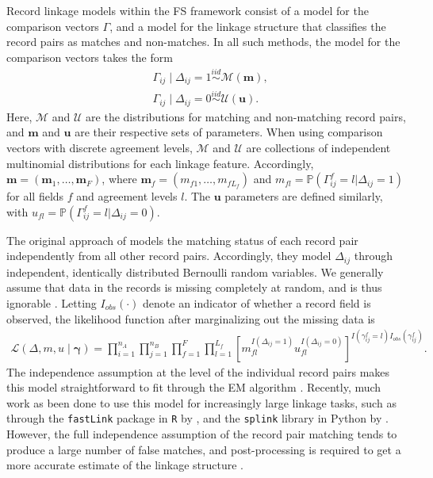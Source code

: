 \documentclass[12pt,letterpaper]{article}
\newcommand{\1}[1]{\mathbb{I}\!\left[#1\right]} %
\begin{document}
Record linkage models within the FS framework consist of a model for the comparison vectors $\Gamma$, and a model for the linkage structure that classifies the record pairs as matches and non-matches. In all such methods, the model for the comparison vectors takes the form
	\begin{align*}
		&\Gamma_{ij} \mid \Delta_{ij} = 1 \stackrel{iid}{\sim} \mathcal{M}(\bm{m}),  \\
		&\Gamma_{ij} \mid \Delta_{ij} = 0  \stackrel{iid}{\sim} \mathcal{U}(\bm{u}).
	\end{align*}
Here, $\mathcal{M}$ and $\mathcal{U}$ are the distributions for matching and non-matching record pairs, and $\bm{m}$ and $\bm{u}$ are their respective sets of parameters. When using comparison vectors with discrete agreement levels, $\mathcal{M}$ and $\mathcal{U}$ are collections of independent multinomial distributions for each linkage feature. Accordingly, $\bm{m} = (\bm{m}_1, \ldots, \bm{m}_F)$, where $\bm{m}_f = (m_{f1}, \ldots, m_{fL_f})$ and $m_{fl} = \mathbb{P}(\Gamma_{ij}^f = l|\Delta_{ij} = 1)$ for all fields $f$ and agreement levels $l$. The $\bm{u}$ parameters are defined similarly, with $u_{fl} = \mathbb{P}(\Gamma_{ij}^f = l|\Delta_{ij} = 0)$. 

The original approach of \cite{fellegi_theory_1969} models the matching status of each record pair independently from all other record pairs. Accordingly, they model $\Delta_{ij}$ through independent, identically distributed Bernoulli random variables. We generally assume that data in the records is missing completely at random, and is thus ignorable \citep{little_statistical_2002}. Letting $I_{obs}(\cdot)$ denote an indicator of whether a record field is observed, the likelihood function after marginalizing out the missing data is
\begin{align}
	\label{eqn:likelihood}
	\mathcal{L}(\Delta, m,u\mid\bm{\gamma})=\prod_{i=1}^{n_A}\prod_{j=1}^{n_B}\prod_{f=1}^F\prod_{l=1}^{L_f}\left[m_{fl}^{I(\Delta_{ij} = 1)}u_{fl}^{I(\Delta_{ij} =0)}\right] ^{I(\gamma_{ij}^{f} = l) I_{obs}(\gamma_{ij}^f)}.
\end{align}
The independence assumption at the level of the individual record pairs makes this model straightforward to fit through the EM algorithm \citep{sariyar_2010}. Recently, much work as been done to use this model for increasingly large linkage tasks, such as through the
\texttt{fastLink} package in \texttt{R} by \cite{enamorado_using_2019}, and the \texttt{splink} library in Python by \cite{Linacre_Lindsay_Manassis_Slade_Hepworth_2022}. However, the full independence assumption of the record pair matching tends to produce a large number of false matches, and post-processing is required to get a more accurate estimate of the linkage structure \cite{jaro_1989}.
 
\end{document}

